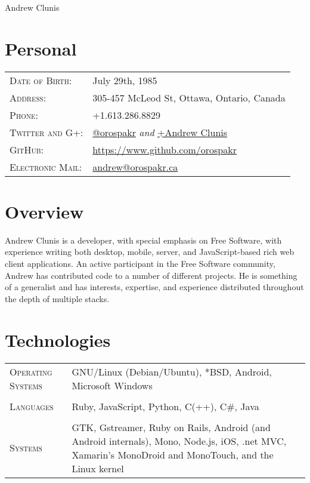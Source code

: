 \documentclass[letterpaper,10pt]{article}
\begin{document}
\pagestyle{empty} %

\par{\centering
{\Huge Andrew \textsc Clunis
}\bigskip\par}

\section{Personal}
\begin{longtable}{p{3cm}|p{12cm}}
  \textsc{Date of Birth:} & July 29th, 1985 \\
  \textsc{Address:} & 305-457 McLeod St, Ottawa, Ontario, Canada \\
  \textsc{Phone:} & +1.613.286.8829 \\
  \textsc{Twitter and G+:} & \href{http://twitter.com/orospakr}{@orospakr} \emph{and} \href{https://plus.google.com/101728978406554574081}{+Andrew Clunis}\\
  \textsc{GitHub:} & \href{https://github.com/orospakr}{https://www.github.com/orospakr} \\
  \textsc{Electronic Mail:} & \href{mailto:andrew@orospakr.ca}{andrew@orospakr.ca} \\
\end{longtable}

\section{Overview}
Andrew Clunis is a developer, with special emphasis on Free Software,
with experience writing both desktop, mobile, server, and
JavaScript-based rich web client applications.  An active participant
in the Free Software community, Andrew has contributed code to a
number of different projects.  He is something of a generalist and has
interests, expertise, and experience distributed throughout the depth
of multiple stacks.

\section{Technologies}
\begin{longtable}{p{3cm}|p{12cm}}
  \textsc{Operating Systems} & GNU/Linux (Debian/Ubuntu), *BSD, Android, Microsoft Windows\\
  \multicolumn{2}{c}{} \\
  \textsc{Languages} & Ruby, JavaScript, Python, C(++), C\#, Java \\
  \multicolumn{2}{c}{} \\
  \textsc{Systems} & GTK, Gstreamer, Ruby on Rails, Android (and Android internals), Mono, Node.js, iOS, .net MVC, Xamarin's MonoDroid and MonoTouch, and the Linux kernel
\end{longtable}
\end{document}
